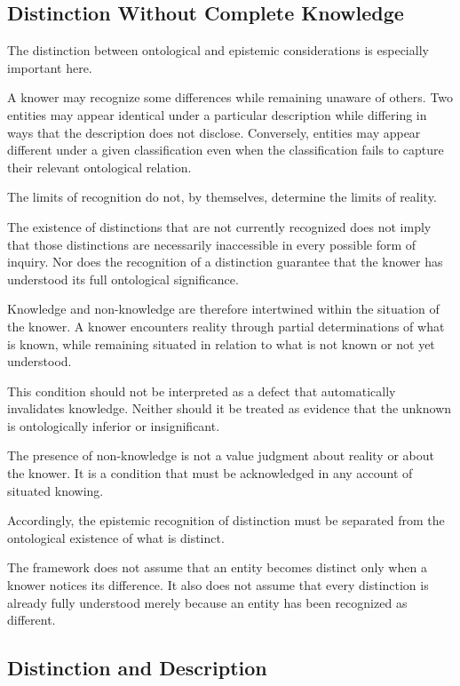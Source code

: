 \subsection{Distinction Without Complete Knowledge}

The distinction between ontological and epistemic
considerations is especially important here.

A knower may recognize some differences while remaining
unaware of others. Two entities may appear identical
under a particular description while differing in ways
that the description does not disclose. Conversely,
entities may appear different under a given classification
even when the classification fails to capture their
relevant ontological relation.

The limits of recognition do not, by themselves,
determine the limits of reality.

The existence of distinctions that are not currently
recognized does not imply that those distinctions are
necessarily inaccessible in every possible form of
inquiry. Nor does the recognition of a distinction
guarantee that the knower has understood its full
ontological significance.

Knowledge and non-knowledge are therefore intertwined
within the situation of the knower. A knower encounters
reality through partial determinations of what is known,
while remaining situated in relation to what is not
known or not yet understood.

This condition should not be interpreted as a defect
that automatically invalidates knowledge. Neither
should it be treated as evidence that the unknown
is ontologically inferior or insignificant.

The presence of non-knowledge is not a value judgment
about reality or about the knower. It is a condition
that must be acknowledged in any account of situated
knowing.

Accordingly, the epistemic recognition of distinction
must be separated from the ontological existence of
what is distinct.

The framework does not assume that an entity becomes
distinct only when a knower notices its difference.
It also does not assume that every distinction is
already fully understood merely because an entity
has been recognized as different.

\subsection{Distinction and Description}

